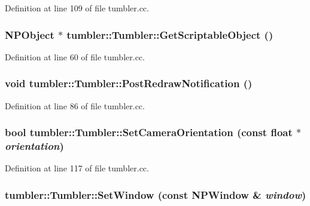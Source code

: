 Definition at line 109 of file tumbler.cc.

\hypertarget{classtumbler_1_1_tumbler_ad438453c62d1edcbdd5cb39a38143a0b}{
\subsubsection[{GetScriptableObject}]{\setlength{\rightskip}{0pt plus 5cm}NPObject $\ast$ tumbler::Tumbler::GetScriptableObject ()}}
\label{classtumbler_1_1_tumbler_ad438453c62d1edcbdd5cb39a38143a0b}


Definition at line 60 of file tumbler.cc.

\hypertarget{classtumbler_1_1_tumbler_ab721f5f95ce020ce6680033771ed4577}{
\subsubsection[{PostRedrawNotification}]{\setlength{\rightskip}{0pt plus 5cm}void tumbler::Tumbler::PostRedrawNotification ()}}
\label{classtumbler_1_1_tumbler_ab721f5f95ce020ce6680033771ed4577}


Definition at line 86 of file tumbler.cc.

\hypertarget{classtumbler_1_1_tumbler_a2657d32f15492fc56406d1750172ca8c}{
\subsubsection[{SetCameraOrientation}]{\setlength{\rightskip}{0pt plus 5cm}bool tumbler::Tumbler::SetCameraOrientation (const float $\ast$ {\em orientation})}}
\label{classtumbler_1_1_tumbler_a2657d32f15492fc56406d1750172ca8c}


Definition at line 117 of file tumbler.cc.

\hypertarget{classtumbler_1_1_tumbler_a6aba2f3cfa10be35c0a789924343b1b0}{
\subsubsection[{SetWindow}]{ tumbler::Tumbler::SetWindow (const {\bf NPWindow} \& {\em window})}}
\label{classtumbler_1_1_tumbler_a6aba2f3cfa10be35c0a789924343b1b0}


